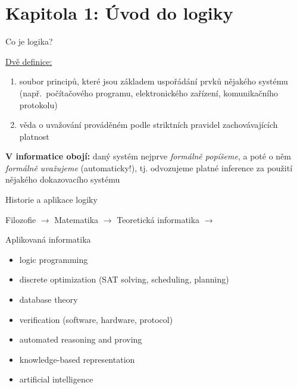 \documentclass{beamer}
\begin{document}
\section{\sc Kapitola 1: Úvod do logiky}


\begin{frame}{Co je logika?}

    
    \begin{block}{\href{https://www.google.com/search?q=define+logic}{Dvě definice:}}
        \begin{enumerate}
            \item soubor principů, které jsou základem uspořádání prvků nějakého systému (např.\ počítačového programu, elektronického zařízení, komunikačního protokolu)
            \item věda o uvažování prováděném podle striktních pravidel zachovávajících platnost 
        \end{enumerate}        
    \end{block}

    \textbf{V informatice obojí:} daný systém nejprve \emph{formálně popíšeme}, a poté o něm \emph{formálně uvažujeme} (automaticky!), tj. odvozujeme \alert{platné inference} za použití nějakého \alert{dokazovacího systému} 

\end{frame}


\begin{frame}{Historie a aplikace logiky}

    {\footnotesize Filozofie $\to$}  {\normalsize Matematika $\to$}  {\large Teoretická informatika $\to$} 
        
    {\Large Aplikovaná informatika}

    \begin{itemize}
        \item logic programming
        \item discrete optimization (SAT solving, scheduling, planning)
        \item database theory
        \item verification (software, hardware, protocol)
        \item automated reasoning and proving
        \item knowledge-based representation
        \item artificial intelligence
    \end{itemize}

\end{frame}
\end{document}
